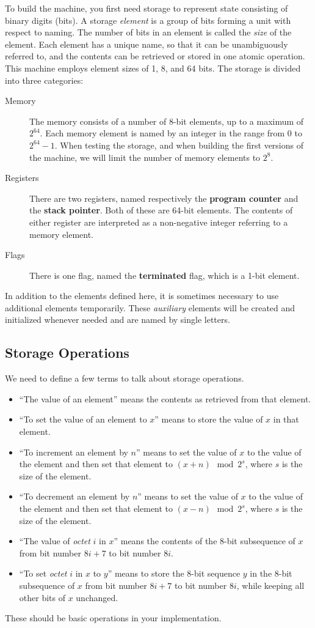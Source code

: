\documentclass[a4paper,12pt]{article}
\newcommand{\PC}{\textbf{program counter}\xspace}
\newcommand{\SP}{\textbf{stack pointer}\xspace}
\newcommand{\TERM}{\textbf{terminated}\xspace}
\begin{document}
To build the machine, you first need storage to represent state consisting of binary digits (bits).
A storage \emph{element} is a group of bits forming a unit with respect to naming.
The number of bits in an element is called the \emph{size} of the element.
Each element has a unique name, so that it can be unambiguously referred to, and the contents can be retrieved or stored in one atomic operation.
This machine employs element sizes of 1, 8, and 64 bits.
The storage is divided into three categories:
\begin{description}
\item[Memory] 
The memory consists of a number of 8-bit elements, up to a maximum of $2^{64}$.
Each memory element is named by an integer in the range from $0$ to $2^{64} - 1$.
When testing the storage, and when building the first versions of the machine, we will limit the number of memory elements to $2^8$.
\item[Registers] 
There are two registers, named respectively the \PC and the \SP.
Both of these are 64-bit elements.
The contents of either register are interpreted as a non-negative integer referring to a memory element.
\item[Flags] 
There is one flag, named the \TERM flag, which is a 1-bit element.
\end{description}
In addition to the elements defined here, it is sometimes necessary to use additional elements temporarily.
These \emph{auxiliary} elements will be created and initialized whenever needed and are named by single letters.

\subsection{Storage Operations}
\label{sec:storage-operations}

We need to define a few terms to talk about storage operations.
\begin{itemize}
\item ``The value of an element'' means the contents as retrieved from that element.
\item ``To set the value of an element to $x$'' means to store the value of $x$ in that element.
\item ``To increment an element by $n$'' means to set the value of $x$ to the value of the element and then set that element to $(x + n) \mod 2^s$, where $s$ is the size of the element.
\item ``To decrement an element by $n$'' means to set the value of $x$ to the value of the element and then set that element to $(x - n) \mod 2^s$, where $s$ is the size of the element.
\item ``The value of \emph{octet} $i$ in $x$'' means the contents of the 8-bit subsequence of $x$ from bit number $8i+7$ to bit number $8i$.
\item ``To set \emph{octet} $i$ in $x$ to $y$'' means to store the 8-bit sequence $y$ in the 8-bit subsequence of $x$ from bit number $8i+7$ to bit number $8i$, while keeping all other bits of $x$ unchanged.
\end{itemize}
These should be basic operations in your implementation.
\end{document}
